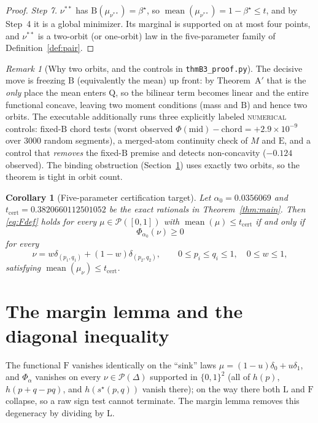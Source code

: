 \documentclass[11pt]{article}
\theoremstyle{plain}
\newtheorem{corollary}[theorem]{Corollary}
\theoremstyle{definition}
\theoremstyle{remark}
\newtheorem{remark}[theorem]{Remark}
\DeclareMathOperator{\mean}{mean}
\newcommand{\PP}{\mathcal P}
\newcommand{\DD}{\Delta}
\newcommand{\sstar}{s^{\star}}
\newcommand{\Lb}{\mathrm{L}}
\newcommand{\Bb}{\mathrm{B}}
\newcommand{\Qq}{\mathrm{Q}}
\newcommand{\Ee}{\mathrm{E}}
\newcommand{\Ff}{\mathrm{F}}
\newcommand{\NUMERICAL}{\textsc{numerical}}
\begin{document}
\begin{proof}
\emph{Step 7.}
$\nu^{**}$ has $\Bb(\mu_{\nu^{**}})=\beta^{\star}$, so
$\mean(\mu_{\nu^{**}})=1-\beta^{\star}\le t$, and by Step~4 it is a global
minimizer.  Its marginal is supported on at most four points, and
$\nu^{**}$ is a two-orbit (or one-orbit) law in the five-parameter family of
Definition~\ref{def:pair}. \qedhere
\end{proof}

\begin{remark}[Why two orbits, and the controls in \texttt{thmB3\_proof.py}]
The decisive move is freezing $\Bb$ (equivalently the mean) up front: by
Theorem~A${}'$ that is the \emph{only} place the mean enters $\Qq$, so the
bilinear term becomes linear and the entire functional concave, leaving two moment
conditions (mass and $\Bb$) and hence two orbits.  The executable additionally
runs three explicitly labeled \NUMERICAL{} controls: fixed-$\Bb$ chord tests
(worst observed
$\Phi(\text{mid})-\text{chord}=+2.9\times10^{-9}$ over 3000 random
segments), a merged-atom continuity check of $M$ and $\Ee$, and a control that
\emph{removes} the fixed-$\Bb$ premise and detects non-concavity
($-0.124$ observed).
The binding obstruction (Section~\ref{sec:margin}) uses exactly two orbits, so
the theorem is tight in orbit count.
\end{remark}

\begin{corollary}[Five-parameter certification target]
\label{cor:5param}
Let $\alpha_0=0.0356069$ and
$t_{\mathrm{cert}}=0.3820660112501052$ be the exact rationals in
Theorem~\ref{thm:main}.  Then \eqref{eq:Fdef} holds for every
$\mu\in\PP([0,1])$ with $\mean(\mu)\le t_{\mathrm{cert}}$ if and only if
\[
\Phi_{\alpha_0}(\nu)\ge0
\]
for every
\[
\nu=w\delta_{(p_1,q_1)}+(1-w)\delta_{(p_2,q_2)},\qquad
0\le p_i\le q_i\le1,\quad 0\le w\le1,
\]
satisfying $\mean(\mu_\nu)\le t_{\mathrm{cert}}$.
\end{corollary}

\section{The margin lemma and the diagonal inequality}
\label{sec:margin}

The functional $\Ff$ vanishes identically on the ``sink'' laws
$\mu=(1-u)\delta_0+u\delta_1$, and $\Phi_\alpha$ vanishes on every
$\nu\in\PP(\DD)$ supported in $\{0,1\}^2$ (all of $h(p)$, $h(p+q-pq)$, and
$h(\sstar(p,q))$ vanish there); on the way there both $\Lb$ and $\Ff$
collapse, so a raw sign test cannot terminate. The margin lemma removes this
degeneracy by dividing by $\Lb$.
\end{document}
